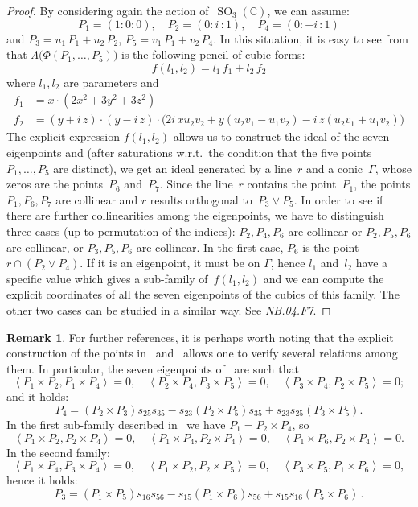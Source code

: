 \documentclass[a4paper, 11pt, reqno]{amsart}
\theoremstyle{plain}
\theoremstyle{definition}
\newtheorem{rmk}[lemma]{Remark}
\newcommand{\C}{\mathbb{C}}
\newcommand{\nb}[2]{\textsl{{NB}.{#1}.{#2}}}
\newcommand{\iii}{\textit{i}\,}
\newcommand{\SO}{\operatorname{SO}}
\newcommand{\scl}[2]{\left\langle {#1}, {#2} \right\rangle}
\begin{document}
\begin{proof}
By considering again the action of~$\SO_3(\C)$, we can assume:
%
\[
  P_1 = (1: 0: 0), \quad
  P_2 = (0: \iii: 1), \quad
  P_4 = (0: -\iii: 1)
\]
%
and $P_3 = u_1 \, P_1 + u_2 \, P_2$, $P_5 = v_1 \, P_1 + v_2 \, P_4$. 
In this situation, it
is easy to see from  that $\Lambda\bigl(\Phi(P_1, \dots, P_5)\bigr)$
is the following pencil of cubic forms:
%
\[
  f(l_1, l_2) = l_1 \, f_1 + l_2 \, f_2
\]
%
where $l_1, l_2$ are parameters and
%
\begin{align*}
 f_1 & = x \cdot \left(2x^{2} + 3 y^{2} + 3 z^{2}\right)\\
  f_2 & = (y + \iii z) \cdot (y - \iii z)
  \cdot \bigl(2 \iii x u_{2} v_{2} + y (u_{2} v_{1}- u_{1} v_{2})
  - \iii z (u_{2} v_{1} + u_{1} v_{2})\bigr)
\end{align*}
%
The explicit expression $f(l_1, l_2)$ allows us to
construct the ideal of the seven eigenpoints and (after
saturations w.r.t.\ the condition that the five points $P_1, \dotsc, P_5$ are distinct),
we get an ideal generated by a line~$r$ and a conic~$\Gamma$, whose zeros are
the points~$P_6$ and~$P_7$. Since the line~$r$ contains the point~$P_1$,
the points $P_1, P_6, P_7$ are collinear and $r$ results orthogonal to~$P_3 \vee P_5$.
In order to see if there are further collinearities among the
eigenpoints, we have to distinguish three cases (up to permutation
of the indices): $P_2, P_4, P_6$ are collinear or $P_2, P_5, P_6$ are
collinear, or $P_3, P_5, P_6$ are collinear. In the first case, $P_6$
is the point $r \cap (P_2\vee P_4)$. If it is an eigenpoint, it must be
on $\Gamma$, hence $l_1$ and~$l_2$ have a specific value which gives a sub-family
of~$f(l_1, l_2)$ and we can compute the explicit coordinates of
all the seven eigenpoints of the cubics of this family. The other two
cases can be studied in a similar way. See \nb{04}{F7}.
\end{proof}
\begin{rmk}
\label{remark:three_orthog} For further references, it is perhaps worth noting that the explicit 
construction of the 
points in~ and~ allows one to verify
several relations among them. In particular, the seven eigenpoints
of~ are such that
\[
\scl{P_1\times P_2}{P_1 \times P_4}=0, \quad 
\scl{P_2\times P_4}{P_3 \times P_5}=0, \quad 
\scl{P_3\times P_4}{P_2 \times P_5}=0;
\]
and it holds:
\[
P_4 = (P_2\times P_3)s_{25}s_{35}-s_{23}(P_2\times P_5)s_{35}+ s_{23}s_{25}(P_3\times P_5).
\]
In the first sub-family described in~ we have 
$P_1 = P_2 \times P_4$, so 
\[
\scl{P_1\times P_2}{P_2 \times P_4}=0, \quad 
\scl{P_1\times P_4}{P_2 \times P_4}=0, \quad 
\scl{P_1\times P_6}{P_2 \times P_4}=0.
\]
In the second family:
\[
\scl{P_1\times P_4}{P_3 \times P_4}=0, \quad 
\scl{P_1\times P_2}{P_2 \times P_5}=0, \quad 
\scl{P_3\times P_5}{P_1 \times P_6}=0,
\]
hence it holds:
\[
P_3 = (P_1 \times P_5)s_{16}s_{56}-s_{15}(P_1\times P_6)s_{56}+s_{15}s_{16}(P_5 \times P_6) \,.
\]
\end{rmk}
%
\end{document}
